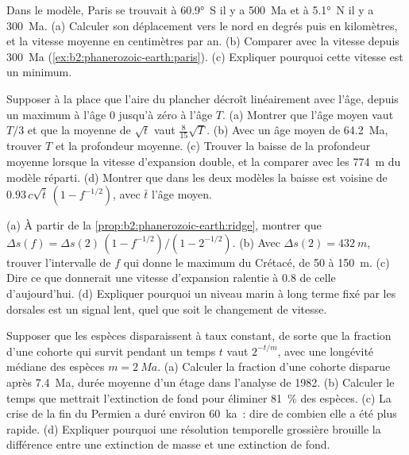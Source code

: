 \begin{exercise}[$\star\star$]\label{exo:b2:phanerozoic-earth:9}
Dans le modèle, Paris se trouvait à \ang{60.9}~S il y a \qty{500}{Ma} et à \ang{5.1}~N il y
a \qty{300}{Ma}. (a) Calculer son déplacement vers le nord en degrés puis en kilomètres, et
la vitesse moyenne en centimètres par an. (b) Comparer avec la vitesse depuis \qty{300}{Ma}
(\cref{ex:b2:phanerozoic-earth:paris}). (c) Expliquer pourquoi cette vitesse est un minimum.
\end{exercise}

\begin{exercise}[$\star\star\star$]\label{exo:b2:phanerozoic-earth:10}
Supposer à la place que l'aire du plancher décroît linéairement avec l'âge, depuis un maximum à l'âge 0 jusqu'à zéro
à l'âge $T$. (a) Montrer que l'âge moyen vaut $T/3$ et que la moyenne de $\sqrt t$ vaut
$\tfrac{8}{15}\sqrt T$. (b) Avec un âge moyen de \qty{64.2}{Ma}, trouver $T$ et la profondeur moyenne. (c)
Trouver la baisse de la profondeur moyenne lorsque la vitesse d'expansion double, et la comparer avec les
\qty{774}{m} du modèle réparti. (d) Montrer que dans les deux modèles la baisse est voisine de $0.93\,c\sqrt{\bar
t}\,(1 - f^{-1/2})$, avec $\bar t$ l'âge moyen.
\end{exercise}

\begin{exercise}[$\star\star\star$]\label{exo:b2:phanerozoic-earth:11}
(a) À partir de la \cref{prop:b2:phanerozoic-earth:ridge}, montrer que $\Delta s(f) = \Delta s(2)\,(1 -
f^{-1/2})/(1 - 2^{-1/2})$. (b) Avec $\Delta s(2) = \qty{432}{m}$, trouver l'intervalle de $f$ qui
donne le maximum du Crétacé, de 50 à \qty{150}{m}. (c) Dire ce que donnerait une vitesse d'expansion ralentie à 0.8 de
celle d'aujourd'hui. (d) Expliquer pourquoi un niveau marin à long terme fixé par les dorsales est un signal lent, quel que soit le changement de
vitesse.
\end{exercise}

\begin{exercise}[$\star\star\star$]\label{exo:b2:phanerozoic-earth:12}
Supposer que les espèces disparaissent à taux constant, de sorte que la fraction d'une cohorte qui survit pendant
un temps $t$ vaut $2^{-t/m}$, avec une longévité médiane des espèces $m = \qty{2}{Ma}$. (a) Calculer la
fraction d'une cohorte disparue après \qty{7.4}{Ma}, durée moyenne d'un étage dans l'analyse de 1982. (b) Calculer
le temps que mettrait l'extinction de fond pour éliminer \qty{81}{\percent} des espèces. (c) La crise de la fin
du Permien a duré environ \qty{60}{ka}~: dire de combien elle a été plus rapide. (d) Expliquer pourquoi une
résolution temporelle grossière brouille la différence entre une extinction de masse et une extinction de fond.
\end{exercise}

